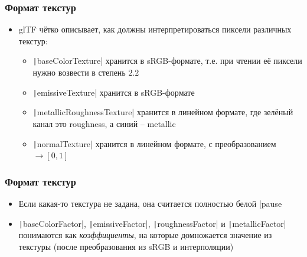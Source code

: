 \documentclass[10pt]{beamer}
\begin{document}
\begin{frame}
\frametitle{Формат текстур}
\begin{itemize}
\item glTF чётко описывает, как должны интерпретироваться пиксели различных текстур:
\pause
\begin{itemize}
\item \texttt|baseColorTexture| хранится в sRGB-формате, т.е. при чтении её пиксели нужно возвести в степень \begin{math}2.2\end{math}
\pause
\item \texttt|emissiveTexture| хранится в sRGB-формате
\pause
\item \texttt|metallicRoughnessTexture| хранится в линейном формате, где зелёный канал это roughness, а синий -- metallic
\pause
\item \texttt|normalTexture| хранится в линейном формате, с преобразованием \begin{math}[-1,1]\rightarrow[0,1]\end{math}
\end{itemize}
\end{itemize}
\end{frame}

\begin{frame}
\frametitle{Формат текстур}
\begin{itemize}
\item Если какая-то текстура не задана, она считается полностью белой
|pause
\item \texttt|baseColorFactor|, \texttt|emissiveFactor|, \texttt|roughnessFactor| и \texttt|metallicFactor| понимаются как \textit{коэффициенты}, на которые домножается значение из текстуры (после преобразования из sRGB и интерполяции)
\end{itemize}
\end{frame}
\end{document}

